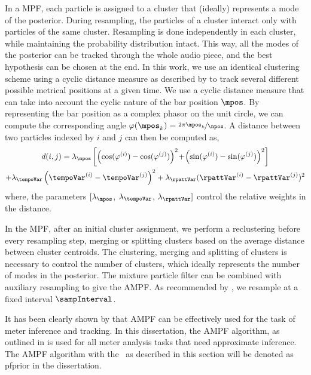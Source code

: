 In a \gls{MPF}, each particle is assigned to a cluster that (ideally) represents a mode of the posterior. During resampling, the particles of a cluster interact only with particles of the same cluster. Resampling is done independently in each cluster, while maintaining the probability distribution intact. This way, all the modes of the posterior can be tracked through the whole audio piece, and the best hypothesis can be chosen at the end. In this work, we use an identical clustering scheme using a cyclic distance measure as described by  to track several different possible metrical positions at a given time. We use a cyclic distance measure that can take into account the cyclic nature of the bar position $\mpos$. By representing the bar position as a complex phasor on the unit circle, we can compute the corresponding angle $\varphi(\mpos_k) = \nicefrac{2\pi \mpos_k}{\npos}$. A distance between two particles indexed by $i$ and $j$ can then be computed as, 
\begin{multline}
d(i,j)=\lambda_{\mpos}\left[\left(\cos(\varphi^{(i)})-\cos(\varphi^{(j)})\right)^{2}\!+\!\left(\sin(\varphi^{(i)})-\sin(\varphi^{(j)})\right)^{2}\right]\\
+\lambda_{\tempoVar}\left(\tempoVar^{(i)}-\tempoVar^{(j)}\right)^{2}+\lambda_{\rpattVar}(\rpattVar^{(i)}-\rpattVar^{(j)})^{2}
\end{multline}
where, the parameters $[\lambda_{\mpos}$, $\lambda_{\tempoVar}$, $\lambda_{\rpattVar}]$ control the relative weights in the distance. 

In the \gls{MPF}, after an initial cluster assignment, we perform a reclustering before every resampling step, merging or splitting clusters based on the average distance between cluster centroids. The clustering, merging and splitting of clusters is necessary to control the number of clusters, which ideally represents the number of modes in the posterior. The mixture particle filter can be combined with auxiliary resampling to give the \gls{AMPF}. As recommended by , we resample at a fixed interval $\sampInterval$. 
%


It has been clearly shown by \citeauthor{krebs:15:pf} that \gls{AMPF} can be effectively used for the task of meter inference and tracking. In this dissertation, the \gls{AMPF} algorithm, as outlined in  is used for all meter analysis tasks that need approximate inference. The \gls{AMPF} algorithm with the \bpmodel\ as described in this section will be denoted as \acrshort{pfprior} in the dissertation. 

